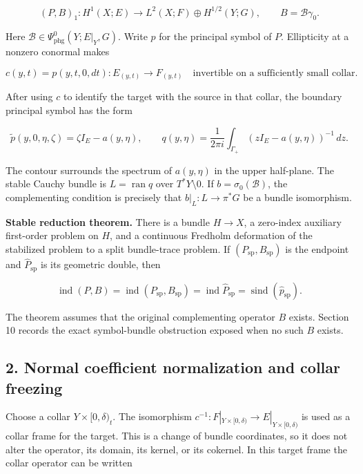 \documentclass[
  11pt,
]{article}
\begin{document}
\[
 (P,B)_1:H^1(X;E)\longrightarrow
 L^2(X;F)\oplus H^{1/2}(Y;G),
 \qquad B=\mathcal B\gamma_0 .
 \tag{BR1}
\]

Here \(\mathcal B\in\Psi_{\mathrm{phg}}^0(Y;E|_Y,G)\). Write \(p\) for
the principal symbol of \(P\). Ellipticity at a nonzero conormal makes

\[
 c(y,t)=p(y,t,0,dt):E_{(y,t)}\longrightarrow F_{(y,t)}
 \quad\text{invertible on a sufficiently small collar.}
 \tag{BR2}
\]

After using \(c\) to identify the target with the source in that collar,
the boundary principal symbol has the form

\[
 \widetilde p(y,0,\eta,\zeta)=\zeta I_E-a(y,\eta),\qquad
 q(y,\eta)=\frac{1}{2\pi i}\int_{\Gamma_+}
 (zI_E-a(y,\eta))^{-1}\,dz .
 \tag{BR3}
\]

The contour surrounds the spectrum of \(a(y,\eta)\) in the upper
half-plane. The stable Cauchy bundle is \(L=\operatorname{ran}q\) over
\(T^*Y\setminus0\). If \(b=\sigma_0(\mathcal B)\), the complementing
condition is precisely that \(b|_L:L\to\pi^*G\) be a bundle isomorphism.

\textbf{Stable reduction theorem.} There is a bundle \(H\to X\), a
zero-index auxiliary first-order problem on \(H\), and a continuous
Fredholm deformation of the stabilized problem to a split bundle-trace
problem. If \((P_{\mathrm{sp}},B_{\mathrm{sp}})\) is the endpoint and
\(\widehat P_{\mathrm{sp}}\) is its geometric double, then

\[
 \boxed{
 \operatorname{ind}(P,B)
 =\operatorname{ind}(P_{\mathrm{sp}},B_{\mathrm{sp}})
 =\operatorname{ind}\widehat P_{\mathrm{sp}}
 =\operatorname{sind}(\widehat p_{\mathrm{sp}}).}
 \tag{BR4}
\]

The theorem assumes that the original complementing operator \(B\)
exists. Section 10 records the exact symbol-bundle obstruction exposed
when no such \(B\) exists.

\subsection{2. Normal coefficient normalization and collar
freezing}\label{normal-coefficient-normalization-and-collar-freezing}

Choose a collar \(Y\times[0,\delta)_t\). The isomorphism
\(c^{-1}:F|_{Y\times[0,\delta)}\to E|_{Y\times[0,\delta)}\) is used as a
collar frame for the target. This is a change of bundle coordinates, so
it does not alter the operator, its domain, its kernel, or its cokernel.
In this target frame the collar operator can be written
\end{document}
